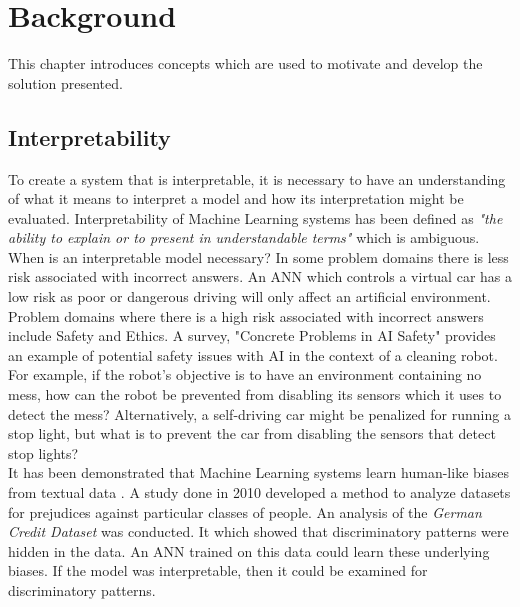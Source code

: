 \chapter{Background}\label{C:backgroundsurvey}
This chapter introduces concepts which are used to motivate and develop the solution presented.

\section{Interpretability}
To create a system that is interpretable, it is necessary to have an understanding of what it means to interpret a model and how its interpretation might be evaluated. Interpretability of Machine Learning systems has been defined as \textit{"the ability to explain or to present in understandable terms"} \cite{doshi2017towards} which is ambiguous.\\

When is an interpretable model necessary? \cite{doshi2017towards} In some problem domains there is less risk associated with incorrect answers. An ANN which controls a virtual car has a low risk as poor or dangerous driving will only affect an artificial environment. Problem domains where there is a high risk associated with incorrect answers include Safety and Ethics. A survey, "Concrete Problems in AI Safety" \cite{amodei2016concrete} provides an example of potential safety issues with AI in the context of a cleaning robot.  For example, if the robot's objective is to have an environment containing no mess, how can the robot be prevented from disabling its sensors which it uses to detect the mess? Alternatively, a self-driving car might be penalized for running a stop light, but what is to prevent the car from disabling the sensors that detect stop lights?\\

It has been demonstrated that Machine Learning systems learn human-like biases from textual data \cite{caliskan2017semantics}. A study done in 2010 \cite{ruggieri2010data} developed a method to analyze datasets for prejudices against particular classes of people. An analysis of the \textit{German Credit Dataset} was conducted. It which showed that discriminatory patterns were hidden in the data. An ANN trained on this data could learn these underlying biases. If the model was interpretable, then it could be examined for discriminatory patterns.\\


